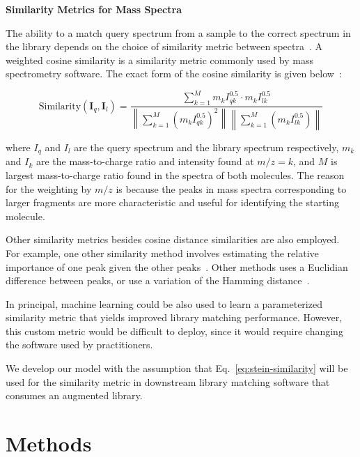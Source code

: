 \textbf{Similarity Metrics for Mass Spectra}

The ability to a match query spectrum from a sample to the correct spectrum in the library depends on the choice of similarity metric between spectra~\cite{mclafferty1974probability,stein1994optimization}.
A weighted cosine similarity is a similarity metric commonly used by mass spectrometry software. The exact form of the cosine similarity is given below~\cite{stein1994optimization}:

\begin{equation}\label{eq:stein-similarity}
\text{Similarity}(\boldsymbol{I}_q, \boldsymbol{I}_l) = \frac{\sum_{k=1}^{M} m_{k} I_{qk}^{0.5} \cdot m_{k} I_{lk}^{0.5}}{\left\lVert\sum_{k=1}^{M} (m_{k} I_{qk}^{0.5})^2\right\rVert \left\lVert\sum_{k=1}^{M} (m_{k} I_{lk}^{0.5})\right\rVert}
\end{equation}

where \textbf{$I_q$} and \textbf{$I_l$} are the query spectrum and the library spectrum respectively, $m_k$ and $I_k$ are the mass-to-charge ratio and intensity found at $m/z = k$, and $M$ is largest mass-to-charge ratio found in the spectra of both molecules. The reason for the weighting by $m/z$ is because the peaks in mass spectra corresponding to larger fragments are more characteristic and useful for identifying the starting molecule.

Other similarity metrics besides cosine distance similarities are also employed. For example, one other similarity method involves estimating the relative importance of one peak given the other peaks~\cite{mclafferty1974probability}. Other methods uses a Euclidian difference between peaks, or use a variation of the Hamming distance~\cite{stein1994optimization,hertz1971identification}.

In principal, machine learning could be also used to learn a parameterized similarity metric that yields improved library matching performance. However, this custom metric would be difficult to deploy, since it would require changing the software used by practitioners. 

We develop our model with the assumption that Eq.~\eqref{eq:stein-similarity} will be used for the similarity metric in downstream library matching software that consumes an augmented library.


\section{Methods}

